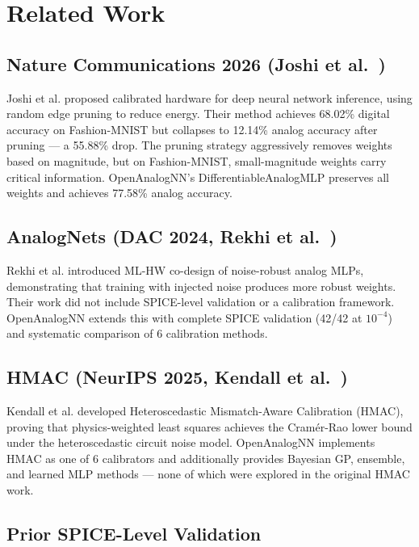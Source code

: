 \documentclass[10pt,twocolumn]{article}
\begin{document}
\section{Related Work}

\subsection{Nature Communications 2026 (Joshi et al.~\cite{joshi2026})}

Joshi et al. proposed calibrated hardware for deep neural network inference, using random edge pruning to reduce energy. Their method achieves 68.02\% digital accuracy on Fashion-MNIST but collapses to 12.14\% analog accuracy after pruning --- a 55.88\% drop. The pruning strategy aggressively removes weights based on magnitude, but on Fashion-MNIST, small-magnitude weights carry critical information. OpenAnalogNN's DifferentiableAnalogMLP preserves all weights and achieves 77.58\% analog accuracy.

\subsection{AnalogNets (DAC 2024, Rekhi et al.~\cite{rekhi2024})}

Rekhi et al. introduced ML-HW co-design of noise-robust analog MLPs, demonstrating that training with injected noise produces more robust weights. Their work did not include SPICE-level validation or a calibration framework. OpenAnalogNN extends this with complete SPICE validation (42/42 at $10^{-4}$) and systematic comparison of 6 calibration methods.

\subsection{HMAC (NeurIPS 2025, Kendall et al.~\cite{kendall2025})}

Kendall et al. developed Heteroscedastic Mismatch-Aware Calibration (HMAC), proving that physics-weighted least squares achieves the Cram\'{e}r-Rao lower bound under the heteroscedastic circuit noise model. OpenAnalogNN implements HMAC as one of 6 calibrators and additionally provides Bayesian GP, ensemble, and learned MLP methods --- none of which were explored in the original HMAC work.

\subsection{Prior SPICE-Level Validation}
\end{document}
